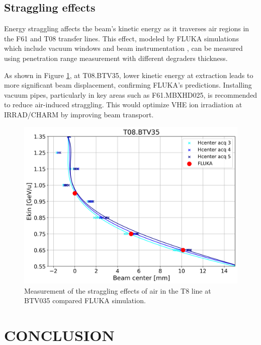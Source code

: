 \documentclass[a4paper,
               biblatex,     %
               ]{jacow}
\begin{document}
\subsection{Straggling effects}
Energy straggling affects the beam's kinetic energy as it traverses air regions in the F61 and T08 transfer lines. This effect, modeled by FLUKA simulations which include vacuum windows and beam instrumentation \cite{battistoni_overview_2015}, can be measured using penetration range measurement with different degraders thickness.

As shown in Figure \ref{fig:straggling_effects}, at T08.BTV35, lower kinetic energy at extraction leads to more significant beam displacement, confirming FLUKA's predictions. Installing vacuum pipes, particularly in key areas such as F61.MBXHD025, is recommended to reduce air-induced straggling. This would optimize VHE ion irradiation at IRRAD/CHARM by improving beam transport.

\begin{figure}[!htb]
   \centering
   \includegraphics*[width=1.0\columnwidth]{straggling_effects.png}
   \caption{Measurement of the straggling effects of air in the T8 line at BTV035 compared FLUKA simulation.}
   \label{fig:straggling_effects}
\end{figure}







\section{CONCLUSION}
\end{document}

